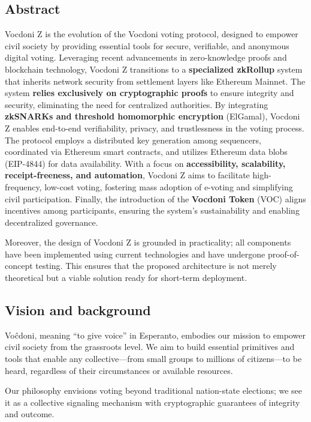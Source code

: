 

\subsection{Abstract}

Vocdoni Z is the evolution of the Vocdoni voting protocol, designed to empower civil society by providing essential tools for secure, verifiable, and anonymous digital voting. Leveraging recent advancements in zero-knowledge proofs and blockchain technology, Vocdoni Z transitions to a \textbf{specialized zkRollup} system that inherits network security from settlement layers like Ethereum Mainnet. The system \textbf{relies exclusively on cryptographic proofs} to ensure integrity and security, eliminating the need for centralized authorities. By integrating \textbf{zkSNARKs and threshold homomorphic encryption} (ElGamal), Vocdoni Z enables end-to-end verifiability, privacy, and trustlessness in the voting process. The protocol employs a distributed key generation among sequencers, coordinated via Ethereum smart contracts, and utilizes Ethereum data blobs (EIP-4844) for data availability. With a focus on \textbf{accessibility, scalability, receipt-freeness, and automation}, Vocdoni Z aims to facilitate high-frequency, low-cost voting, fostering mass adoption of e-voting and simplifying civil participation. Finally, the introduction of the \textbf{Vocdoni Token} (VOC) aligns incentives among participants, ensuring the system's sustainability and enabling decentralized governance.

Moreover, the design of Vocdoni Z is grounded in practicality; all components have been implemented using current technologies and have undergone proof-of-concept testing. This ensures that the proposed architecture is not merely theoretical but a viable solution ready for short-term deployment.

\subsection{Vision and background}

Voĉdoni, meaning “to give voice” in Esperanto, embodies our mission to empower civil society from the grassroots level. We aim to build essential primitives and tools that enable any collective—from small groups to millions of citizens—to be heard, regardless of their circumstances or available resources.

Our philosophy envisions voting beyond traditional nation-state elections; we see it as a collective signaling mechanism with cryptographic guarantees of integrity and outcome.

